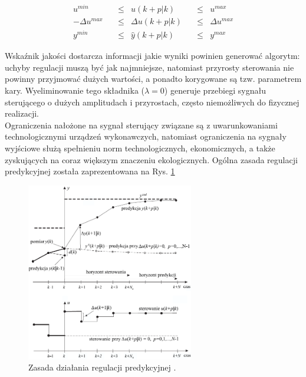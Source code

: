 \begin{equation}
\begin{aligned}
u^{min} \quad &\leq& u(k+p|k) \quad &\leq& u^{max} \\
-\Delta u^{max} \quad &\leq& \Delta u(k+p|k) \quad &\leq& \Delta u^{max} \\
y^{min} \quad &\leq& \hat{y}(k+p|k) \quad &\leq& y^{max}
\end{aligned}
\end{equation}

\newpage

Wskaźnik jakości dostarcza informacji jakie wyniki powinien generować algorytm: uchyby regulacji muszą być jak najmniejsze, natomiast przyrosty sterowania nie powinny przyjmować dużych wartości, a ponadto korygowane są tzw. parametrem kary. Wyeliminowanie tego składnika ($\lambda = 0$) generuje przebiegi sygnału sterującego o dużych amplitudach i przyrostach, często niemożliwych do fizycznej realizacji. \\
Ograniczenia nałożone na sygnał sterujący związane są z uwarunkowaniami technologicznymi urządzeń wykonawczych, natomiast ograniczenia na sygnały wyjściowe służą spełnieniu norm technologicznych, ekonomicznych, a także zyskujących na coraz większym znaczeniu ekologicznych. Ogólna zasada regulacji predykcyjnej została zaprezentowana na Rys. \ref{mpc}

\begin{figure}[h!]
\centering
\includegraphics[width=0.65\textwidth]{pictures/mpc}
\caption{Zasada działania regulacji predykcyjnej \cite{122}.}
\label{mpc}
\end{figure}

